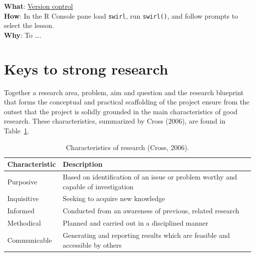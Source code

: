 \documentclass[
  letterpaper,
]{latex/krantz}
\begin{document}
\begin{tcolorbox}[enhanced jigsaw, opacitybacktitle=0.6, breakable, colframe=quarto-callout-tip-color-frame, arc=.35mm, left=2mm, leftrule=.75mm, title=\textcolor{quarto-callout-tip-color}{\faLightbulb}\hspace{0.5em}{Interactive programming}, opacityback=0, colback=white, toptitle=1mm, rightrule=.15mm, titlerule=0mm, bottomtitle=1mm, bottomrule=.15mm, coltitle=black, colbacktitle=quarto-callout-tip-color!10!white, toprule=.15mm]
\textbf{What}: \href{https://github.com/lin380/swirl}{Version control}\\
\textbf{How}: In the R Console pane load \texttt{swirl}, run
\texttt{swirl()}, and follow prompts to select the lesson.\\
\textbf{Why}: To \ldots.
\end{tcolorbox}

\hypertarget{keys-to-strong-research}{%
\section{Keys to strong research}\label{keys-to-strong-research}}

Together a research area, problem, aim and question and the research
blueprint that forms the conceptual and practical scaffolding of the
project ensure from the outset that the project is solidly grounded in
the main characteristics of good research. These characteristics,
summarized by Cross (2006), are found in
Table~\ref{tbl-fr-cross-research-char-table}.

\hypertarget{tbl-fr-cross-research-char-table}{}
\begin{table}
\caption{\label{tbl-fr-cross-research-char-table}Characteristics of research (Cross, 2006). }\tabularnewline

\centering
\begin{tabular}{ll}
\toprule
Characteristic & Description\\
\midrule
Purposive & Based on identification of an issue or problem worthy and capable of investigation\\
Inquisitive & Seeking to acquire new knowledge\\
Informed & Conducted from an awareness of previous, related research\\
Methodical & Planned and carried out in a disciplined manner\\
Communicable & Generating and reporting results which are feasible and accessible by others\\
\bottomrule
\end{tabular}
\end{table}
\end{document}
